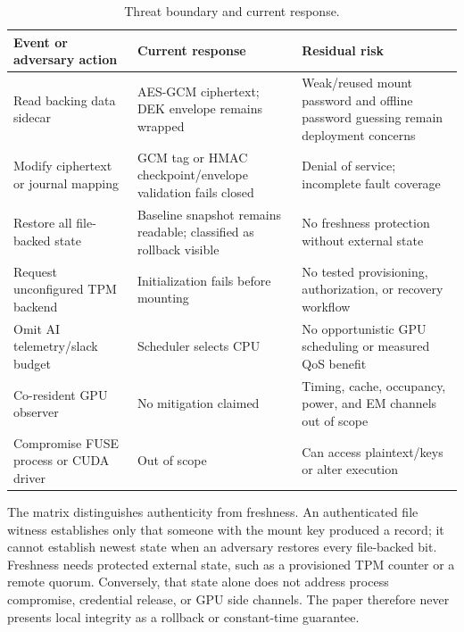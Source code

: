 \begin{table}[t]
\centering
\caption{Threat boundary and current response.}
\scriptsize
\renewcommand{\arraystretch}{0.96}
\setlength{\tabcolsep}{2pt}
\begin{tabularx}{\columnwidth}{P{0.24\columnwidth}|P{0.34\columnwidth}|Y}
\toprule
\textbf{Event or adversary action} & \textbf{Current response} & \textbf{Residual risk}\\
\midrule
Read backing data sidecar & AES-GCM ciphertext; DEK envelope remains wrapped & Weak/reused mount password and offline password guessing remain deployment concerns\\
Modify ciphertext or journal mapping & GCM tag or HMAC checkpoint/envelope validation fails closed & Denial of service; incomplete fault coverage\\
Restore all file-backed state & Baseline snapshot remains readable; classified as rollback visible & No freshness protection without external state\\
Request unconfigured TPM backend & Initialization fails before mounting & No tested provisioning, authorization, or recovery workflow\\
Omit AI telemetry/slack budget & Scheduler selects CPU & No opportunistic GPU scheduling or measured QoS benefit\\
Co-resident GPU observer & No mitigation claimed & Timing, cache, occupancy, power, and EM channels out of scope\\
Compromise FUSE process or CUDA driver & Out of scope & Can access plaintext/keys or alter execution\\
\bottomrule
\end{tabularx}
\renewcommand{\arraystretch}{1}
\end{table}

The matrix distinguishes authenticity from freshness.  An authenticated file
witness establishes only that someone with the mount key produced a record; it
cannot establish newest state when an adversary restores every file-backed bit.
Freshness needs protected external state, such as a provisioned TPM counter or
a remote quorum.  Conversely, that state alone does not address process
compromise, credential release, or GPU side channels.  The paper therefore
never presents local integrity as a rollback or constant-time guarantee.

